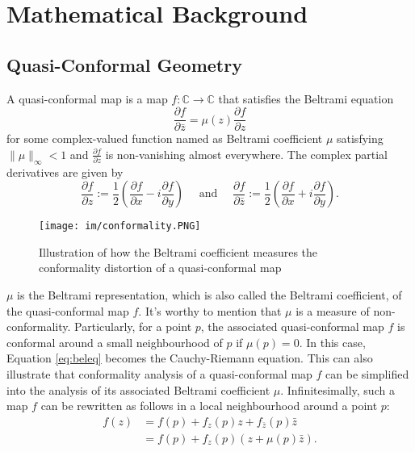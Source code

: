 \section{Mathematical Background}
\subsection{Quasi-Conformal Geometry}

\begin{definition}
A quasi-conformal map is a map $f: \mathbb{C} \rightarrow \mathbb{C}$ that satisfies the Beltrami equation
\begin{equation}
\frac{\partial f}{\partial \bar{z}}=\mu(z) \frac{\partial f}{\partial z}
\label{eq:beleq}
\end{equation}
for some complex-valued function named as Beltrami coefficient $\mu$ satisfying $\|\mu\|_{\infty}<1$ and $\frac{\partial f}{\partial z}$ is non-vanishing almost everywhere. The complex partial derivatives are given by
\begin{equation}
\frac{\partial f}{\partial z}:=\frac{1}{2}\left(\frac{\partial f}{\partial x}-i \frac{\partial f}{\partial y}\right) 
\quad \text{ and } \quad 
\frac{\partial f}{\partial \bar{z}}:=\frac{1}{2}\left(\frac{\partial f}{\partial x}+i \frac{\partial f}{\partial y}\right).
\end{equation}

\begin{figure}
    \centering
    \texttt{[image: im/conformality.PNG]}
    \caption{Illustration of how the Beltrami coefficient measures the conformality distortion of a quasi-conformal map}
    \label{fig:qcmap}
\end{figure}

\end{definition}
$\mu$ is the Beltrami representation, which is also called the Beltrami coefficient, of the quasi-conformal map $f$. It's worthy to mention that $\mu$ is a measure of non-conformality. Particularly, for a point $p$, the associated quasi-conformal map $f$ is conformal around a small neighbourhood of $p$ if $\mu(p)=0$. In this case, Equation \ref{eq:beleq} becomes the Cauchy-Riemann equation. This can also illustrate that conformality analysis of a quasi-conformal map $f$ can be simplified into the analysis of its associated Beltrami coefficient $\mu$. Infinitesimally, such a map $f$ can be rewritten as follows in a local neighbourhood around a point $p$:
\begin{equation}
\begin{aligned}
f(z) &=f(p)+f_{z}(p) z+f_{\bar{z}}(p) \bar{z} \\
&=f(p)+f_{z}(p)(z+\mu(p) \bar{z}).
\end{aligned}
\end{equation}
